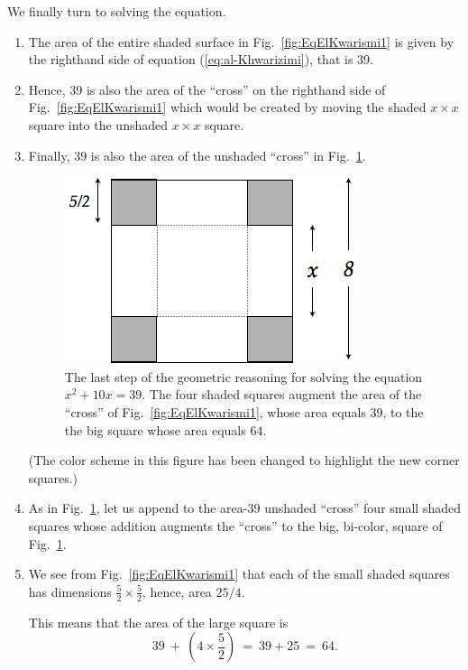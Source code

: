 We finally turn to solving the equation.
\begin{enumerate}
\item
The area of the entire shaded surface in Fig.~\ref{fig:EqElKwarismi1} is given by the righthand side of equation (\ref{eq:al-Khwarizimi}), that is $39$.
\medskip\item
Hence, $39$ is also the area of the ``cross'' on the righthand side of Fig.~\ref{fig:EqElKwarismi1} which would be created by moving the shaded $x \times x$ square into the unshaded $x \times x$ square.
\medskip\item
Finally, $39$ is also the area of the unshaded ``cross'' in Fig.~\ref{fig:EqElKwarismi2}.
\begin{figure}[ht]
\begin{center}
       \includegraphics[scale=0.4]{FiguresArithmetic/EquationElKwarismi2}
\caption{The last step of the geometric reasoning for solving the equation $x^2 + 10x = 39$.  The four shaded squares augment the area of the ``cross'' of Fig.~\ref{fig:EqElKwarismi1}, whose area equals $39$, to the the big square whose area equals $64$.}
       \label{fig:EqElKwarismi2}
\end{center}
\end{figure}
(The color scheme in this figure has been changed to highlight the new corner squares.)

\medskip\item
As in Fig.~\ref{fig:EqElKwarismi2}, let us append to the area-$39$ unshaded ``cross'' four small shaded squares whose addition augments the ``cross'' to the big, bi-color, square of
Fig.~\ref{fig:EqElKwarismi2}.

\medskip\item
We see from Fig.~\ref{fig:EqElKwarismi1} that each of the small shaded squares has dimensions $\frac{5}{2} \times \frac{5}{2}$, hence, area $25/4$.

This means that the area of the large square is
\[ 39 \ + \ \left( 4 \times \frac{5}{2} \right) \ = \ 39 + 25 \ = \ 64. \]
\end{enumerate}

